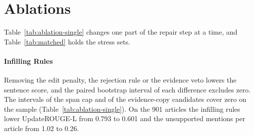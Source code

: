 \documentclass[11pt]{article}
\newcommand{\edit}{\textsc{edit}}
\begin{document}
\begin{table}[tb]
\centering
\small
\setlength{\tabcolsep}{5pt}
\caption{Single-round ablations. The mask and ranking rows are scored on the 1,670 supported test \edit{} sentences, with the difference to copy. The infilling-rule rows remove one rule at a time on the 300-article sample, with the difference to the setting that has all of them. Bold marks the best run of each group.}
\label{tab:ablation-single}
\end{table}

\section{Ablations}
\label{sec:ablations}

Table~\ref{tab:ablation-single} changes one part of the repair step at a time, and Table~\ref{tab:matched} holds the stress sets.

\paragraph{Infilling Rules}
Removing the edit penalty, the rejection rule or the evidence veto lowers the sentence score, and the paired bootstrap interval of each difference excludes zero. The intervals of the span cap and of the evidence-copy candidates cover zero on the sample (Table~\ref{tab:ablation-single}). On the 901 articles the infilling rules lower UpdateROUGE-L from 0.793 to 0.601 and the unsupported mentions per article from 1.02 to 0.26.
\end{document}
